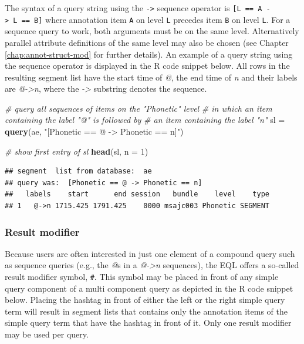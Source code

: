 \documentclass[]{book}
\newenvironment{Shaded}{\begin{snugshade}}{\end{snugshade}}
\newcommand{\CommentTok}[1]{\textcolor[rgb]{0.56,0.35,0.01}{\textit{#1}}}
\newcommand{\DataTypeTok}[1]{\textcolor[rgb]{0.13,0.29,0.53}{#1}}
\newcommand{\DecValTok}[1]{\textcolor[rgb]{0.00,0.00,0.81}{#1}}
\newcommand{\KeywordTok}[1]{\textcolor[rgb]{0.13,0.29,0.53}{\textbf{#1}}}
\newcommand{\NormalTok}[1]{#1}
\newcommand{\StringTok}[1]{\textcolor[rgb]{0.31,0.60,0.02}{#1}}
\begin{document}
The syntax of a query string using the \texttt{-\textgreater{}} sequence operator is \texttt{{[}L\ ==\ A\ -\textgreater{}\ L\ ==\ B{]}} where annotation item \texttt{A} on level \texttt{L} precedes item \texttt{B} on level \texttt{L}. For a sequence query to work, both arguments must be on the same level. Alternatively parallel attribute definitions of the same level may also be chosen (see Chapter \ref{chap:annot-struct-mod} for further details). An example of a query string using the sequence operator is displayed in the R code snippet below. All rows in the resulting segment list have the start time of \emph{@}, the end time of \emph{n} and their labels are \emph{@-\textgreater{}n}, where the \emph{-\textgreater{}} substring denotes the sequence.

\begin{Shaded}
\begin{Highlighting}[]
\CommentTok{# query all sequences of items on the "Phonetic" level}
\CommentTok{# in which an item containing the label "@" is followed by}
\CommentTok{# an item containing the label "n"}
\NormalTok{sl =}\StringTok{ }\KeywordTok{query}\NormalTok{(ae, }\StringTok{"[Phonetic == @ -> Phonetic == n]"}\NormalTok{)}

\CommentTok{# show first entry of sl}
\KeywordTok{head}\NormalTok{(sl, }\DataTypeTok{n =} \DecValTok{1}\NormalTok{)}
\end{Highlighting}
\end{Shaded}

\begin{verbatim}
## segment  list from database:  ae 
## query was:  [Phonetic == @ -> Phonetic == n] 
##   labels    start      end session   bundle    level    type
## 1   @->n 1715.425 1791.425    0000 msajc003 Phonetic SEGMENT
\end{verbatim}

\hypertarget{result-modifier}{%
\subsubsection{Result modifier}\label{result-modifier}}

Because users are often interested in just one element of a compound query such as sequence queries (e.g., the \emph{@}s in a \emph{@-\textgreater{}n} sequences), the EQL offers a so-called result modifier symbol, \texttt{\#}. This symbol may be placed in front of any simple query component of a multi component query as depicted in the R code snippet below. Placing the hashtag in front of either the left or the right simple query term will result in segment lists that contains only the annotation items of the simple query term that have the hashtag in front of it. Only one result modifier may be used per query.
\end{document}
